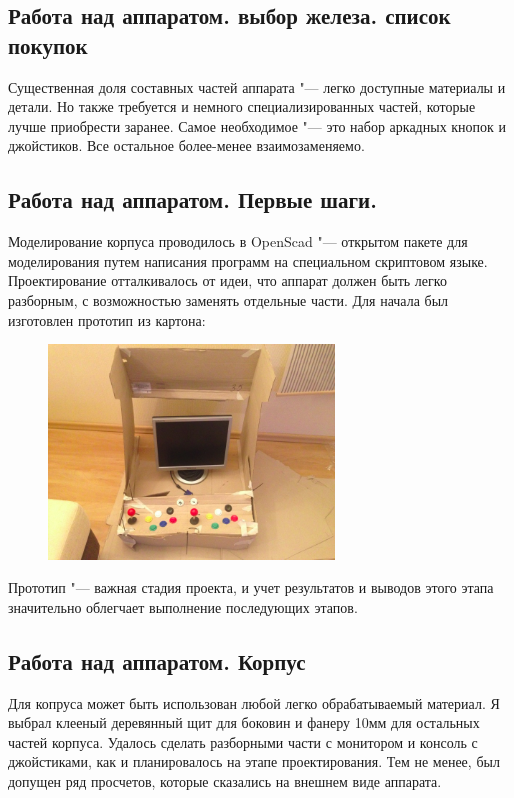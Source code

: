 \documentclass[10pt, a5paper]{article}
\begin{document}
\subsection*{Работа над аппаратом. выбор железа. список покупок}

Существенная доля составных частей аппарата "--- легко доступные материалы и детали. Но также требуется и немного специализированных частей, которые лучше приобрести заранее.
Самое необходимое "--- это набор аркадных кнопок и джойстиков. Все \linebreak остальное более-менее взаимозаменяемо.

\subsection*{Работа над аппаратом. Первые шаги.}

Моделирование корпуса проводилось в OpenScad "--- \linebreak открытом пакете для моделирования путем написания программ на специальном скриптовом языке. Проектирование отталкивалось от идеи, что аппарат должен быть легко разборным, с возможностью заменять отдельные части.
Для начала был изготовлен прототип из картона:

\begin{figure}[h!]
  \centering
  \includegraphics[height=5.7cm]{27_2016_Sorokin2.png}
\end{figure}


Прототип "--- важная стадия проекта, и учет результатов и выводов этого этапа значительно облегчает выполнение последующих этапов.

\subsection*{Работа над аппаратом. Корпус}

Для копруса может быть использован любой легко обрабатываемый материал. Я выбрал клееный деревянный щит для боковин и фанеру 10мм для остальных частей корпуса. 
Удалось сделать разборными части с монитором и консоль с джойстиками, как и планировалось на этапе проектирования.
Тем не менее, был допущен ряд просчетов, которые сказались на внешнем виде аппарата.
\end{document}
